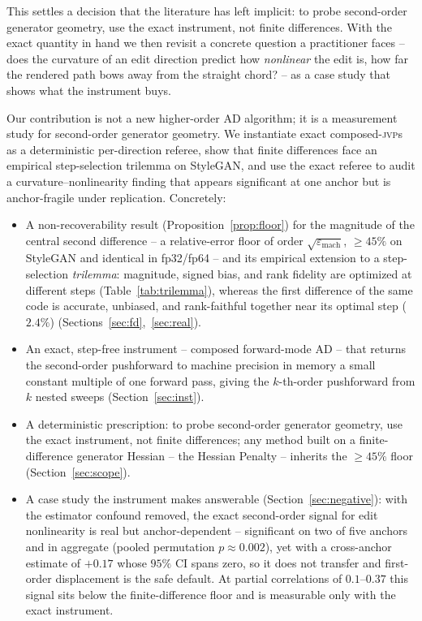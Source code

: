\documentclass[10pt]{article}
\newcommand{\jvp}{\textsc{jvp}}
\newcommand{\eps}{\varepsilon}
\begin{document}
This settles a decision that the literature has left implicit: to probe second-order
generator geometry, use the exact instrument, not finite differences. With the exact
quantity in hand we then revisit a concrete question a practitioner faces -- does the
curvature of an edit direction predict how \emph{nonlinear} the edit is, how far the
rendered path bows away from the straight chord? -- as a case study that shows what the
instrument buys.

Our contribution is not a new higher-order AD algorithm; it is a measurement study for
second-order generator geometry. We instantiate exact composed-\jvp{}s as a deterministic
per-direction referee, show that finite differences face an empirical step-selection trilemma
on StyleGAN, and use the exact referee to audit a curvature--nonlinearity finding that appears
significant at one anchor but is anchor-fragile under replication. Concretely:

\begin{itemize}
\item A non-recoverability result (Proposition~\ref{prop:floor}) for the magnitude of the
central second difference -- a relative-error floor of order $\sqrt{\eps_{\mathrm{mach}}}$,
$\geq45\%$ on StyleGAN and identical in fp32/fp64 -- and its empirical extension to a
step-selection \emph{trilemma}: magnitude, signed bias, and rank fidelity are optimized at
different steps (Table~\ref{tab:trilemma}), whereas the first difference of the same code is
accurate, unbiased, and rank-faithful together near its optimal step ($2.4\%$)
(Sections~\ref{sec:fd},~\ref{sec:real}).
\item An exact, step-free instrument -- composed forward-mode AD -- that returns the
second-order pushforward to machine precision in memory a small constant multiple of one
forward pass, giving the $k$-th-order pushforward from $k$ nested sweeps
(Section~\ref{sec:inst}).
\item A deterministic prescription: to probe second-order generator geometry, use the exact
instrument, not finite differences; any method built on a finite-difference generator
Hessian -- the Hessian Penalty \citep{peebles2020} -- inherits the $\geq45\%$ floor
(Section~\ref{sec:scope}).
\item A case study the instrument makes answerable (Section~\ref{sec:negative}): with the
estimator confound removed, the exact second-order signal for edit nonlinearity is real but
anchor-dependent -- significant on two of five anchors and in aggregate (pooled permutation
$p\approx0.002$), yet with a cross-anchor estimate of $+0.17$ whose $95\%$ CI spans zero, so
it does not transfer and first-order displacement is the safe default. At partial
correlations of $0.1$--$0.37$ this signal sits below the finite-difference floor and is
measurable only with the exact instrument.
\end{itemize}
\end{document}
